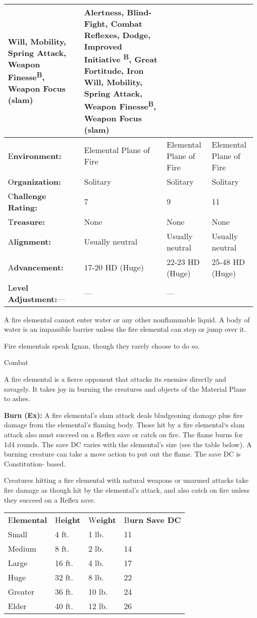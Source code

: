 \documentclass{article}
\begin{document}
\begin{tabular}{|>{\raggedright}p{48pt}|>{\raggedright}p{72pt}|>{\raggedright}p{87pt}|>{\raggedright}p{93pt}|}
Will, Mobility, Spring Attack, Weapon Finesse\textsuperscript{B}, Weapon Focus 
(slam) & Alertness, Blind-Fight, Combat Reflexes, Dodge, Improved Initiative \textsuperscript{B}, 
Great Fortitude, Iron Will, Mobility, Spring Attack, Weapon Finesse\textsuperscript{B}, 
Weapon Focus (slam)\tabularnewline
\hline
E\textbf{nvironment:} & Elemental Plane of Fire & Elemental Plane of Fire & Elemental 
Plane of Fire\tabularnewline
\hline
O\textbf{rganization:} & Solitary & Solitary & Solitary\tabularnewline
\hline
C{\small{}\textbf{hallenge Rating:}} & 7 & 9 & 1{\small{}1}\tabularnewline
\hline
T\textbf{reasure:} & None & None & None\tabularnewline
\hline
A\textbf{lignment:} & Usually neutral & Usually neutral & Usually neutral\tabularnewline
\hline
A\textbf{dvancement:} & 17-20 HD (Huge) & 22-23 HD (Huge) & 25-48 HD (Huge)\tabularnewline
\hline
L\textbf{evel Adjustment:}--- & --- & --- & \tabularnewline
\hline
\end{tabular}

\vspace{12pt}
A fire elemental cannot enter water or any other nonflammable liquid. A body of 
water is an impassible barrier unless the fire elemental can step or jump over 
it.

Fire elementals speak Ignan, though they rarely choose to do so.

Combat

A fire elemental is a fierce opponent that attacks its enemies directly and savagely. 
It takes joy in burning the creatures and objects of the Material Plane to ashes.

\textbf{Burn (Ex): }A fire elemental's slam attack deals bludgeoning damage plus 
fire damage from the elemental's flaming body. Those hit by a fire elemental`s 
slam attack also must succeed on a Reflex save or catch on fire. The flame burns 
for 1d4 rounds. The save DC varies with the elemental's size (see the table below). 
A burning creature can take a move action to put out the flame. The save DC is 
Constitution- based.

Creatures hitting a fire elemental with natural weapons or unarmed attacks take 
fire damage as though hit by the elemental's attack, and also catch on fire unless 
they succeed on a Reflex save.

\begin{tabular}{|>{\raggedright}p{42pt}|>{\raggedright}p{27pt}|>{\raggedright}p{29pt}|>{\raggedright}p{60pt}|}
\hline
\multicolumn{4}{|p{160pt}|}{F\textbf{ire Elemental Sizes}}\tabularnewline
\hline
E\textbf{lemental} & H\textbf{eight} & W\textbf{eight} & B\textbf{urn Save DC}\tabularnewline
\hline
Small & 4 ft. & 1 lb. & 11\tabularnewline
\hline
Medium & 8 ft. & 2 lb. & 14\tabularnewline
\hline
Large & 16 ft. & 4 lb. & 17\tabularnewline
\hline
Huge & 32 ft. & 8 lb. & 22\tabularnewline
\hline
Greater & 36 ft. & 10 lb. & 24\tabularnewline
\hline
Elder & 40 ft. & 12 lb. & 26\tabularnewline
\hline
\end{tabular}
\end{document}
